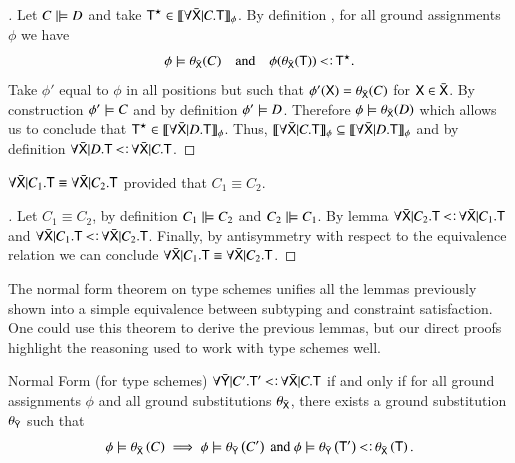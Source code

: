 \documentclass{report}
\begin{document}
  \begin{proof}[]
    Let $C\mathrel|\models D$ and take $\textsf{T}^\star\in\llbracket{\forall\bar{\textsf{X}}|C.\textsf{T}}\rrbracket_{\phi}$.
    By definition , for all ground assignments $\phi$ we have
    \begin{displaymath}
      \phi\csat\theta_{\bar{\type{X}}}(C) \quad\textrm{and}\quad
      \phi(\theta_{\bar{\type{X}}}(\type{T}))\subtype\type{T}^\star\textrm{.}
    \end{displaymath}
    Take $\phi'$ equal to $\phi$ in all positions but such that
    $\phi'(\textsf{X})=\theta_{\bar{\textsf{X}}}(C)$ for $\textsf{X}\in\bar{\textsf{X}}$.
    By construction $\phi'\models C$ and by definition  $\phi'\models D$.
    Therefore $\phi\models\theta_{\bar{\textsf{X}}}(D)$ which allows us to conclude
    that $\textsf{T}^\star\in\llbracket{\forall\bar{\textsf{X}}|D.\textsf{T}}\rrbracket_{\phi}$.
    Thus, $\llbracket{\forall\bar{\textsf{X}}|C.\textsf{T}}\rrbracket_{\phi}\subseteq\llbracket{\forall\bar{\textsf{X}}|D.\textsf{T}}\rrbracket_{\phi}$ and by definition 
    $\forall\bar{\type{X}}|D.\type{T}\subtype\forall\bar{\type{X}}|C.\type{T}$.
  \end{proof}
  \begin{cor}
    $\forall\bar{\textsf{X}}|C_1.\textsf{T}\equiv\forall\bar{\textsf{X}}|C_2.\textsf{T}$
    provided that $C_1\equiv C_2$.
  \end{cor}
  \begin{proof}[]
    Let $C_1\equiv C_2$, by definition  $C_1\mathrel|\models C_2$ and
    $C_2\mathrel|\models C_1$. By lemma 
    $\forall\bar{\type{X}}|C_2.\type{T}\subtype\forall\bar{\type{X}}|C_1.\type{T}$ and
    $\forall\bar{\type{X}}|C_1.\type{T}\subtype\forall\bar{\type{X}}|C_2.\type{T}$.
    Finally, by antisymmetry with respect to the equivalence relation
     we can conclude
    $\forall\bar{\textsf{X}}|C_1.\textsf{T}\equiv\forall\bar{\textsf{X}}|C_2.\textsf{T}$. 
  \end{proof}
  The normal form theorem on type schemes unifies all the lemmas previously shown into
  a simple equivalence between subtyping and constraint satisfaction. One could use this
  theorem to derive the previous lemmas, but our direct proofs highlight the reasoning
  used to work with type schemes well.
  \begin{thm}{Normal Form (for type schemes)}
    $\forall\bar{\type{Y}}|C'.\type{T}'\subtype\forall\bar{\type{X}}|C.\type{T}$ if and only if
    for all ground assignments $\phi$ and all ground substitutions $\theta_{\bar{\textsf{X}}}$, there
    exists a ground substitution $\theta_{\bar{\textsf{Y}}}$ such that
    \begin{displaymath}
      \phi\csat \theta_{\bar{\type{X}}}\lrp{C} \implies
      \phi\csat \theta_{\bar{\type{Y}}}\lrp{C'}\textrm{ and }
      \phi\csat \theta_{\bar{\type{Y}}}\lrp{\type{T}'}\subtype\theta_{\bar{\type{X}}}\lrp{\type{T}}\textrm{.}
    \end{displaymath}
  \end{thm}
\end{document}
